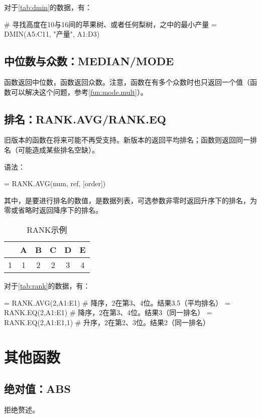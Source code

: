 对于\autoref{tab:dmin}的数据，有：
\begin{excode}
# 寻找高度在10与16间的苹果树、或者任何梨树，之中的最小产量
= DMIN(A5:C11, "产量", A1:D3)  
\end{excode}

\subsection{中位数与众数：MEDIAN/MODE}
函数返回中位数，函数返回众数。注意，函数在有多个众数时也只返回一个值（函数可以解决这个问题，参考\autoref{fun:mode.mult}）。

\subsection{排名：RANK.AVG/RANK.EQ}
旧版本的函数在将来可能不再受支持。新版本的返回平均排名；函数则返回同一排名（可能造成某些排名空缺）。

语法：
\begin{syntax}
= RANK.AVG(num, ref, [order])
\end{syntax}
其中，是要进行排名的数值，是数据列表，可选参数非零时返回升序下的排名，为零或省略时返回降序下的排名。

\begin{table}[!hbt]
    \centering
    \caption{RANK示例}\label{tab:rank}
    \begin{tabular}{c|ccccc}
    \hline
      & A & B & C & D & E\\
    \hline
    1 & 1 & 2 & 2 & 3 & 4\\
    \hline
    \end{tabular}
\end{table}

对于\autoref{tab:rank}的数据，有：
\begin{excode}
= RANK.AVG(2,A1:E1)  # 降序，2在第3、4位。结果3.5（平均排名）
= RANK.EQ(2,A1:E1)  # 降序，2在第3、4位。结果3（同一排名）
= RANK.EQ(2,A1:E1,1)  # 升序，2在第2、3位。结果2（同一排名）
\end{excode}

\section{其他函数}
\subsection{绝对值：ABS}
拒绝赘述。

